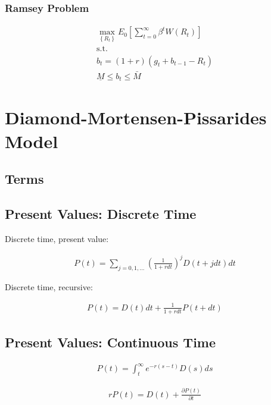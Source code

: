 \documentclass[10pt]{article}
\begin{document}
\subsubsection{Ramsey Problem}

\begin{align}
    \max _{\left\{R_t\right\}} E_0\left[\sum_{t=0}^{\infty} \beta^t W\left(R_t\right)\right] \\
    \text{s.t.} \\
    b_t=(1+r)\left(g_t+b_{t-1}-R_t\right) \\
    \underline{M} \leq b_t \leq \bar{M}
\end{align}

\section{Diamond-Mortensen-Pissarides Model}

\subsection{Terms}



\subsection{Present Values: Discrete Time}

Discrete time, present value:

\begin{align}
    P(t)=\sum_{j=0,1, \ldots}\left(\frac{1}{1+r d t}\right)^j D(t+j d t) d t
\end{align}

Discrete time, recursive:

\begin{align}
    P(t)=D(t) d t+\frac{1}{1+r d t} P(t+d t)
\end{align}

\subsection{Present Values: Continuous Time}

\begin{align}
    P(t)=\int_t^{\infty} e^{-r(s-t)} D(s) d s
\end{align}

\begin{align}
    r P(t)=D(t)+\frac{\partial P(t)}{\partial t}
\end{align}
\end{document}
